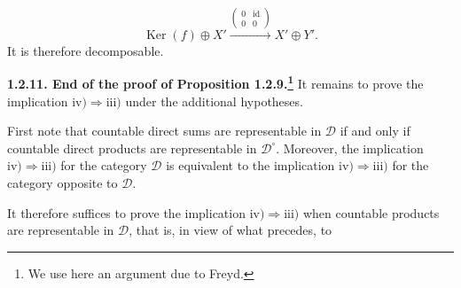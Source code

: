 \[
  \operatorname{Ker}(f)\oplus X'
  \xrightarrow{\left(\begin{smallmatrix}0&\operatorname{id}\\0&0\end{smallmatrix}\right)}
  X'\oplus Y'.
\]
It is therefore decomposable.

\medskip
\noindent\textbf{1.2.11. End of the proof of Proposition 1.2.9.\footnote{We
use here an argument due to Freyd.}}
It remains to prove the implication
$\mathrm{iv)}\Longrightarrow\mathrm{iii)}$ under the additional
hypotheses.

First note that countable direct sums are representable in $\mathcal D$ if
and only if countable direct products are representable in
$\mathcal D^{\circ}$. Moreover, the implication
$\mathrm{iv)}\Longrightarrow\mathrm{iii)}$ for the category $\mathcal D$
is equivalent to the implication
$\mathrm{iv)}\Longrightarrow\mathrm{iii)}$ for the category opposite to
$\mathcal D$.

It therefore suffices to prove the implication
$\mathrm{iv)}\Longrightarrow\mathrm{iii)}$ when countable products are
representable in $\mathcal D$, that is, in view of what precedes, to
\endgroup
